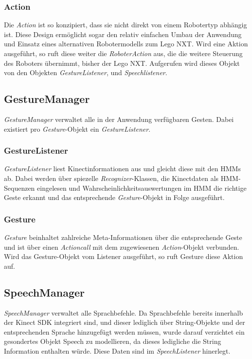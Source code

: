 \subsubsection{Action}
Die \textit{Action} ist so konzipiert, dass sie nicht direkt von einem Robotertyp abh\"angig ist. Diese Design erm\"oglicht sogar den relativ einfachen Umbau der Anwendung und Einsatz eines alternativen Robotermodells zum Lego NXT.
\newline
Wird eine Aktion ausgef\"uhrt, so ruft diese weiter die \textit{RoboterAction} aus, die die weitere Steuerung des Roboters \"ubernimmt, bisher der Lego NXT. Aufgerufen wird dieses Objekt von den Objekten \textit{GestureListener}, und \textit{Speechlistener}.

\subsection{GestureManager}
\textit{GestureManager} verwaltet alle in der Anwendung verf\"ugbaren Gesten. Dabei existiert pro \textit{Gesture}-Objekt ein \textit{GestureListener}.

\subsubsection{GestureListener}
\textit{GestureListener} liest Kinectinformationen aus und gleicht diese mit den \glspl{HMM} ab. Dabei werden \"uber spiezelle \textit{Recognizer}-Klassen, die Kinectdaten als HMM-Sequenzen eingelesen und Wahrscheinlichkeitsauswertungen im \gls{HMM} die richtige Geste erkannt und das entsprechende \textit{Gesture}-Objekt in Folge ausgef\"uhrt.

\subsubsection{Gesture}
\textit{Gesture} beinhaltet zahlreiche Meta-Informationen \"uber die entsprechende Geste und ist \"uber einen \textit{Actioncall} mit dem zugewiesenen \textit{Action}-Objekt verbunden. Wird das Gesture-Objekt vom Listener ausgef\"uhrt, so ruft Gesture diese Aktion auf.

\subsection{SpeechManager}
\textit{SpeechManager} verwaltet alle Sprachbefehle. Da Sprachbefehle bereits innerhalb der Kinect SDK integriert sind, und dieser lediglich \"uber String-Objekte und der entsprechenden Sprache hinzugef\"ugt werden m\"ussen, wurde darauf verzichtet ein gesondertes Objekt {Speech} zu modellieren, da dieses ledigliche die String Information enthalten w\"urde. Diese Daten sind im \textit{SpeechListener} hinerlegt.

